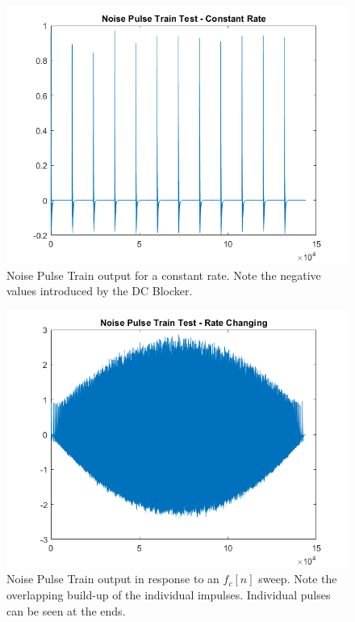 \documentclass[../main.tex]{subfiles}
\begin{document}
\begin{figure}[h]
    \centering
    \includegraphics[scale=.65]{./images/plots/NPTTest1.png}
    \caption{Noise Pulse Train output for a constant rate. Note the negative values introduced by the DC Blocker.}
    \label{fig:NPTT1}
\end{figure}

\begin{figure}[h]
    \centering
    \includegraphics[scale=.65]{./images/plots/NPTTest2.png}
    \caption{Noise Pulse Train output in response to an $f_c[n]$ sweep. Note the overlapping build-up of the individual impulses. Individual pulses can be seen at the ends.}
    \label{fig:NPTT2}
\end{figure}
\end{document}
